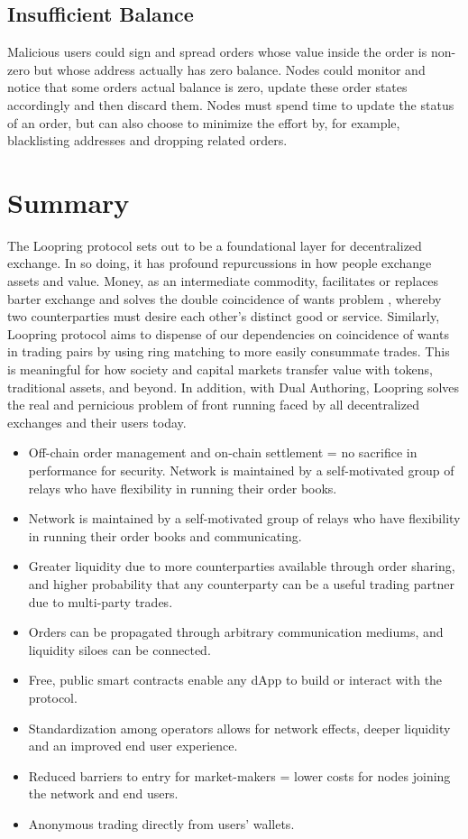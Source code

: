 \documentclass[UTF8,nofonts]{article}
\begin{document}
\begin{multicols}{2}
\subsection{Insufficient Balance}
Malicious users could sign and spread orders whose value inside the order is non-zero but whose address actually has zero balance. Nodes could monitor and notice that some orders actual balance is zero, update these order states accordingly and then discard them.
Nodes must spend time to update the status of an order, but can also choose to minimize the effort by, for example, blacklisting addresses and dropping related orders.

\section{Summary}
The Loopring protocol sets out to be a foundational layer for decentralized exchange. In so doing, it has profound repurcussions in how people exchange assets and value. Money, as an intermediate commodity, facilitates or replaces barter exchange and solves the double coincidence of wants problem \cite{unenumerated2006}, whereby two counterparties must desire each other's distinct good or service. Similarly, Loopring protocol aims to dispense of our dependencies on coincidence of wants in trading pairs by using ring matching to more easily consummate trades. This is meaningful for how society and capital markets transfer value with tokens, traditional assets, and beyond. In addition, with Dual Authoring, Loopring solves the real and pernicious problem of front running faced by all decentralized exchanges and their users today.

\begin{itemize}
	\item Off-chain order management and on-chain settlement = no sacrifice in performance for security.
Network is maintained by a self-motivated group of relays who have flexibility in running their order books.
	\item Network is maintained by a self-motivated group of relays who have flexibility in running their order books and communicating.
	\item Greater liquidity due to more counterparties available through order sharing, and higher probability that any counterparty can be a useful trading partner due to multi-party trades.
	\item Orders can be propagated through arbitrary communication mediums, and liquidity siloes can be connected.
	\item Free, public smart contracts enable any dApp to build or interact with the protocol.
	\item Standardization among operators allows for network effects, deeper liquidity and an improved end user experience.
	\item Reduced barriers to entry for market-makers = lower costs for nodes joining the network and end users.
	\item Anonymous trading directly from users’ wallets.
\end{itemize}


\end{multicols}
\end{document}

